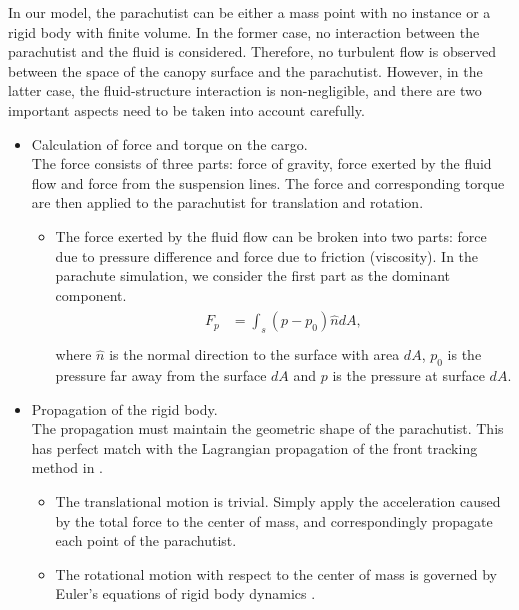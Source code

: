 In our model, the parachutist can be either a mass point with no instance or
a rigid body with finite volume.
In the former case, no interaction between the parachutist and the fluid is
considered.
Therefore, no turbulent flow is observed between the space of the canopy
surface and the parachutist.
However, in the latter case, the fluid-structure interaction is non-negligible,
and there are two important aspects need to be taken into account carefully.
\begin{itemize}
\item Calculation of force and torque on the cargo. \\
    The force consists of three parts: force of gravity, force exerted by the
    fluid flow and force from the suspension lines.
    The force and corresponding torque are then applied to the parachutist for
    translation and rotation.
    \begin{itemize}
    \item The force exerted by the fluid flow can be broken into two parts:
    force due to pressure difference and force due to friction (viscosity).
    In the parachute simulation, we consider the first part as the dominant
    component.
    \begin{eqnarray}
    \begin{aligned}
    F_p &= \int_{s} (p - p_0)\hat{n} dA, \\
    \end{aligned}
    \end{eqnarray}
    where $\hat{n}$ is the normal direction to the surface with area $dA$,
    $p_0$ is the pressure far away from the surface $dA$
    and $p$ is the pressure at surface $dA$.
    \end{itemize}
\item Propagation of the rigid body. \\
    The propagation must maintain the geometric shape of the parachutist.
    This has perfect match with the Lagrangian propagation of the front
    tracking method in \FronTierp \cite{GliGroLi99a,DuFixGli05}.
    \begin{itemize}
    \item The translational motion is trivial.
    Simply apply the acceleration caused by the total force to the center of
    mass, and correspondingly propagate each point of the parachutist.
    \item The rotational motion with respect to the center of mass is governed
    by Euler's equations  of rigid body dynamics
    \cite{goldstein2001}.
    \end{itemize}
\end{itemize}




